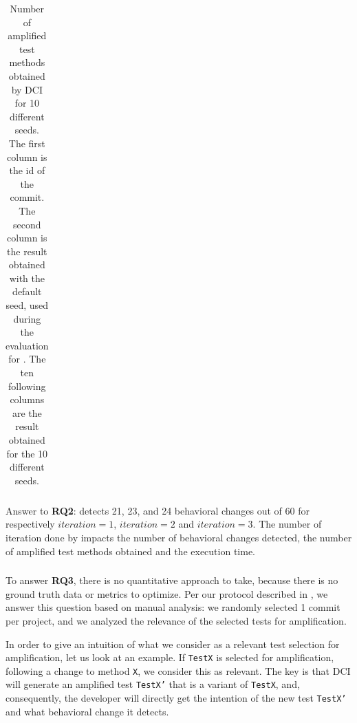 \begin{table}
\small
\def\arraystretch{.5}%
\setlength\tabcolsep{3pt} %
\caption{Number of amplified test methods obtained by DCI for 10 different seeds. The first column is the id of the commit. The second column is the result obtained with the default seed, used during the evaluation for \rqdetection. The ten following columns are the result obtained for the 10 different seeds.}
\label{tab:overall_result_seeds}
\begin{tabular}{l|c|llllllllll}

\end{tabular}
\end{table}

\begin{mdframed}
Answer to \textbf{RQ2}: \DCII detects  21, 23, and 24 behavioral changes out of 60 for respectively $iteration=1$, $iteration=2$ and $iteration=3$.
The number of iteration done by \DCII impacts the number of behavioral changes detected, the number of amplified test methods obtained and the execution time.
\end{mdframed}


\subsubsection{\rqselection}
\label{subsubsec:answerq3}

To answer \textbf{RQ3}, there is no quantitative approach to take, because there is no ground truth data or metrics to optimize. 
Per our protocol described in , we answer this question based on manual analysis:
we randomly selected 1 commit per project, and we analyzed the relevance of the selected tests for amplification.

In order to give an intuition of what we consider as a relevant test selection for amplification, let us look at an example. 
If \texttt{TestX} is selected for amplification, following a change to method \texttt{X}, we consider this as relevant. The key is that DCI will generate an amplified test \texttt{TestX'} that is a variant of \texttt{TestX}, and, consequently, the developer will directly get the intention of the new test \texttt{TestX'} and what behavioral change it detects.

